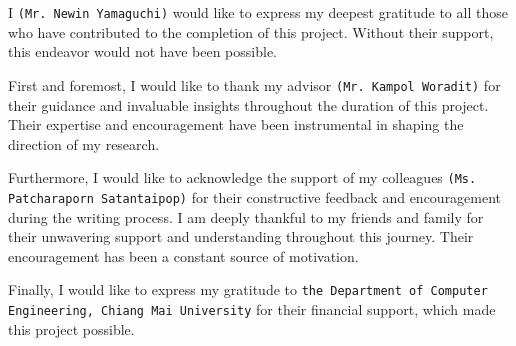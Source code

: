 \begin{acknowledgments}

I \texttt{(Mr. Newin Yamaguchi)} would like to express my deepest gratitude to all those who have contributed to the completion of this project. Without their support, this endeavor would not have been possible.

First and foremost, I would like to thank my advisor \texttt{(Mr. Kampol Woradit)} for their guidance and invaluable insights throughout the duration of this project. Their expertise and encouragement have been instrumental in shaping the direction of my research.

Furthermore, I would like to acknowledge the support of my colleagues \texttt{(Ms. Patcharaporn Satantaipop)} for their constructive feedback and encouragement during the writing process.
I am deeply thankful to my friends and family for their unwavering support and understanding throughout this journey. Their encouragement has been a constant source of motivation.

Finally, I would like to express my gratitude to \texttt{the Department of Computer Engineering, Chiang Mai University} for their financial support, which made this project possible.

\end{acknowledgments}%
\fi %

\contentspage

\ifproject
\figurelistpage
\tablelistpage
\fi %



